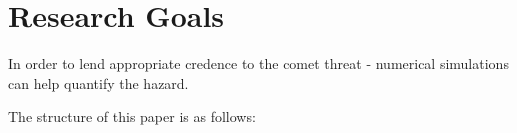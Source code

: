 



\section{Research Goals}

In order to lend appropriate credence to the comet threat - numerical simulations can help quantify the hazard.

The structure of this paper is as follows: